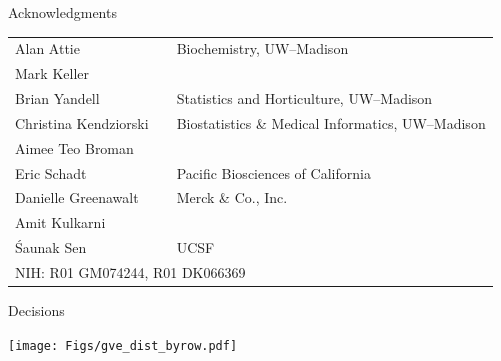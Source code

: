 \documentclass[12pt]{article}
\newcommand{\headsize}{\fontsize{35}{35} \selectfont}
\newcommand{\smallersize}{\fontsize{20}{25} \selectfont}
\begin{document}
\headsize \color{myyellow}
\hfill \begin{minipage}{5.75in}
\centering
Acknowledgments
\end{minipage}

\vspace{2cm} \color{mywhite} \smallersize

\hfill \begin{minipage}{10in}

\setlength{\tabcolsep}{5mm}
\begin{tabular}{lll} 
Alan Attie&&
{\color{myblue} Biochemistry, UW--Madison} \\
Mark Keller &&
\\[24pt]

Brian Yandell && 
{\color{myblue} Statistics and Horticulture, UW--Madison} \\[24pt]

Christina Kendziorski &&
{\color{myblue} Biostatistics \& Medical Informatics, UW--Madison} \\
Aimee Teo Broman && \\[24pt]

Eric Schadt && 
{\color{myblue} Pacific Biosciences of California} \\[24pt]

Danielle Greenawalt &&
{\color{myblue} Merck \& Co., Inc.} \\
Amit Kulkarni && \\[24pt]

\'Saunak Sen &&
{\color{myblue} UCSF} \\[48pt]

\multicolumn{3}{l}{\color{mypink}NIH: \color{myblue} R01 GM074244, R01 DK066369}


\end{tabular}
\end{minipage}

\newpage


\headsize \color{myyellow}
\hfill \begin{minipage}{5.75in}
\centering
Decisions
\end{minipage}

\vfill

\centerline{\texttt{[image: Figs/gve\_dist\_byrow.pdf]}}
\end{document}
